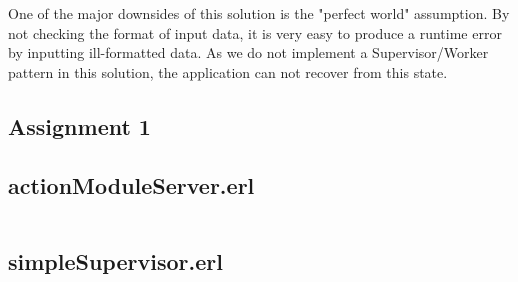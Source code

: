 \documentclass[11pt, a4paper]{article}
\begin{document}
One of the major downsides of this solution is the "perfect world" assumption. By not checking the format of input data, it is very easy to produce a runtime error by inputting ill-formatted data. As we do not implement a Supervisor/Worker pattern in this solution, the application can not recover from this state.

\begin{appendices}
	\section{Assignment 1}
	\subsection{actionModuleServer.erl}
	\inputminted[breaklines]{erlang}{../../github/AP/assignment5/src/actionModuleServer.erl}
	\subsection{simpleSupervisor.erl}
	\inputminted[breaklines]{erlang}{../../github/AP/assignment5/src/simpleSupervisor.erl}
\end{appendices}
\end{document}
